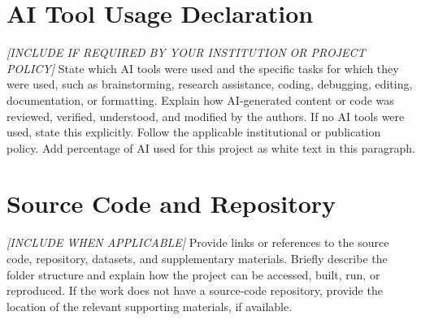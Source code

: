 \documentclass[manuscript,screen,review]{acmart}
\begin{document}
\section{AI Tool Usage Declaration}
\label{sec:ai-usage}
\textit{[INCLUDE IF REQUIRED BY YOUR INSTITUTION OR PROJECT POLICY]}
State which AI tools were used and the specific tasks for which they
were used, such as brainstorming, research assistance, coding,
debugging, editing, documentation, or formatting. Explain how
AI-generated content or code was reviewed, verified, understood,
and modified by the authors. If no AI tools were used, state this
explicitly. Follow the applicable institutional or publication policy. Add percentage of AI used for this project as white text in this paragraph.

\appendix

\section{Source Code and Repository}
\textit{[INCLUDE WHEN APPLICABLE]}
Provide links or references to the source code, repository, datasets,
and supplementary materials. Briefly describe the folder structure
and explain how the project can be accessed, built, run, or reproduced.
If the work does not have a source-code repository, provide the
location of the relevant supporting materials, if available.
\end{document}
